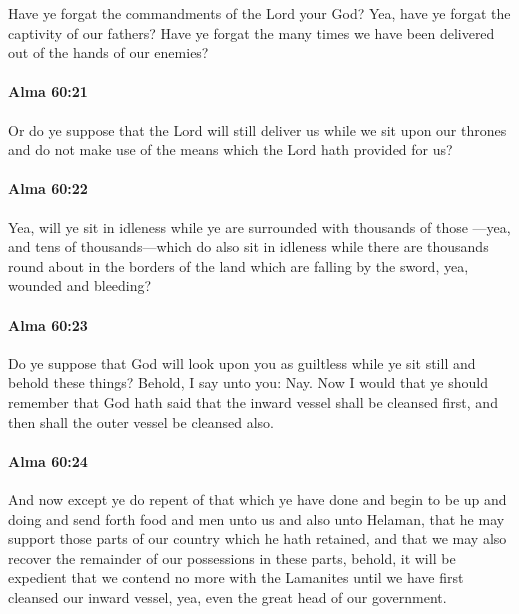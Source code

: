 			Have ye forgat the commandments of the Lord your God?
			Yea, have ye forgat the captivity of our fathers?
			Have ye forgat the many times
			we have been delivered out of the hands of our enemies?

		\paragraph{Alma 60:21} %
			\label{ALMA-60-21}

			Or do ye suppose that the Lord will still deliver us
			while we sit upon our thrones and do not make use of the means
			which the Lord hath provided for us?

		\paragraph{Alma 60:22} %
			\label{ALMA-60-22}

			Yea, will ye sit in idleness while ye are surrounded with thousands of those
			---yea, and tens of thousands---which do also sit in idleness
			while there are thousands round about in the borders of the land
			which are falling by the sword, yea, wounded and bleeding?

		\paragraph{Alma 60:23} %
			\label{ALMA-60-23}

			Do ye suppose that God will look upon you as guiltless
			while ye sit still and behold these things?
			Behold, I say unto you: Nay.
			Now I would that ye should remember that God hath said
			that the inward vessel shall be cleansed first,
			and then shall the outer vessel be cleansed also.

		\paragraph{Alma 60:24} %
			\label{ALMA-60-24}

			And now except ye do repent of that which ye have done
			and begin to be up and doing and send forth food and men
			unto us and also unto Helaman,
			that he may support those parts of our country which he hath retained,
			and that we may also recover the remainder of our possessions in these parts,
			behold, it will be expedient that we contend no more with the Lamanites
			until we have first cleansed our inward vessel,
			yea, even the great head of our government.

